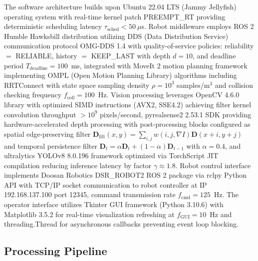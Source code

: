 \documentclass[journal]{IEEEtran}
\begin{document}
The software architecture builds upon Ubuntu 22.04 LTS (Jammy Jellyfish) operating system with real-time kernel patch PREEMPT\_RT providing deterministic scheduling latency $\tau_{\text{sched}} < 50~\mu$s. Robot middleware employs ROS 2 Humble Hawksbill distribution utilizing DDS (Data Distribution Service) communication protocol OMG-DDS 1.4 with quality-of-service policies: reliability $= $ RELIABLE, history $= $ KEEP\_LAST with depth $d = 10$, and deadline period $T_{\text{deadline}} = 100$~ms, integrated with MoveIt 2 motion planning framework implementing OMPL (Open Motion Planning Library) algorithms including RRTConnect with state space sampling density $\rho = 10^3$ samples/m$^3$ and collision checking frequency $f_{\text{coll}} = 100$~Hz. Vision processing leverages OpenCV 4.6.0 library with optimized SIMD instructions (AVX2, SSE4.2) achieving filter kernel convolution throughput $> 10^9$ pixels/second, pyrealsense2 2.53.1 SDK providing hardware-accelerated depth processing with post-processing blocks configured as spatial edge-preserving filter $\mathbf{D}_{\text{filt}}(x,y) = \sum_{i,j} w(i,j, \nabla I) \mathbf{D}(x+i, y+j)$ and temporal persistence filter $\mathbf{D}_t = \alpha \mathbf{D}_t + (1-\alpha) \mathbf{D}_{t-1}$ with $\alpha = 0.4$, and ultralytics YOLOv8 8.0.196 framework optimized via TorchScript JIT compilation reducing inference latency by factor $\gamma \approx 1.8$. Robot control interface implements Doosan Robotics DSR\_ROBOT2 ROS 2 package via rclpy Python API with TCP/IP socket communication to robot controller at IP 192.168.137.100 port 12345, command transmission rate $f_{\text{cmd}} = 125$~Hz. The operator interface utilizes Tkinter GUI framework (Python 3.10.6) with Matplotlib 3.5.2 for real-time visualization refreshing at $f_{\text{GUI}} = 10$~Hz and threading.Thread for asynchronous callbacks preventing event loop blocking.

\subsection{Processing Pipeline}
\end{document}
